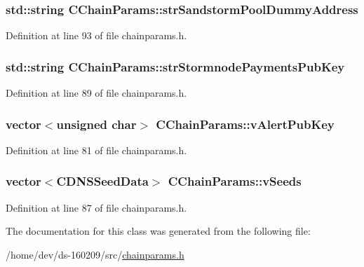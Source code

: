 \subsubsection[{str\+Sandstorm\+Pool\+Dummy\+Address}]{\setlength{\rightskip}{0pt plus 5cm}std\+::string C\+Chain\+Params\+::str\+Sandstorm\+Pool\+Dummy\+Address\hspace{0.3cm}{\ttfamily [protected]}}\label{class_c_chain_params_aefacc57cc8df894c78529dbadcf7fc20}


Definition at line 93 of file chainparams.\+h.

\hypertarget{class_c_chain_params_a3ade9f41f8926331f4eb6aa1417444d3}{}
\subsubsection[{str\+Stormnode\+Payments\+Pub\+Key}]{\setlength{\rightskip}{0pt plus 5cm}std\+::string C\+Chain\+Params\+::str\+Stormnode\+Payments\+Pub\+Key\hspace{0.3cm}{\ttfamily [protected]}}\label{class_c_chain_params_a3ade9f41f8926331f4eb6aa1417444d3}


Definition at line 89 of file chainparams.\+h.

\hypertarget{class_c_chain_params_a9c48773a65415e2ecac36556f93daf1d}{}
\subsubsection[{v\+Alert\+Pub\+Key}]{\setlength{\rightskip}{0pt plus 5cm}vector$<$unsigned char$>$ C\+Chain\+Params\+::v\+Alert\+Pub\+Key\hspace{0.3cm}{\ttfamily [protected]}}\label{class_c_chain_params_a9c48773a65415e2ecac36556f93daf1d}


Definition at line 81 of file chainparams.\+h.

\hypertarget{class_c_chain_params_ad62171f08f60fe9cce01636df7d0839f}{}
\subsubsection[{v\+Seeds}]{\setlength{\rightskip}{0pt plus 5cm}vector$<${\bf C\+D\+N\+S\+Seed\+Data}$>$ C\+Chain\+Params\+::v\+Seeds\hspace{0.3cm}{\ttfamily [protected]}}\label{class_c_chain_params_ad62171f08f60fe9cce01636df7d0839f}


Definition at line 87 of file chainparams.\+h.



The documentation for this class was generated from the following file\+:\begin{DoxyCompactItemize}
\item 
/home/dev/ds-\/160209/src/\hyperlink{chainparams_8h}{chainparams.\+h}\end{DoxyCompactItemize}
